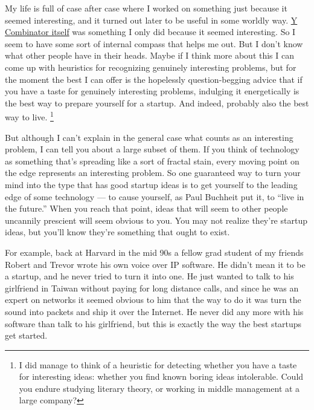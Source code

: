 \documentclass[12pt]{book}
\begin{document}
My life is full of case after case where I worked on something just
because it seemed interesting, and it turned out later to be useful in
some worldly way. \href{http://ycombinator.com/start.html}{Y Combinator
itself} was something I only did because it seemed interesting. So I
seem to have some sort of internal compass that helps me out. But I
don't know what other people have in their heads. Maybe if I think more
about this I can come up with heuristics for recognizing genuinely
interesting problems, but for the moment the best I can offer is the
hopelessly question-begging advice that if you have a taste for
genuinely interesting problems, indulging it energetically is the best
way to prepare yourself for a startup. And indeed, probably also the
best way to live. \footnote{I did manage to think of a heuristic for detecting whether you
have a taste for interesting ideas: whether you find known boring ideas
intolerable. Could you endure studying literary theory, or working in
middle management at a large company?}

But although I can't explain in the general case what counts as an
interesting problem, I can tell you about a large subset of them. If you
think of technology as something that's spreading like a sort of fractal
stain, every moving point on the edge represents an interesting problem.
So one guaranteed way to turn your mind into the type that has good
startup ideas is to get yourself to the leading edge of some technology
--- to cause yourself, as Paul Buchheit put it, to ``live in the
future.'' When you reach that point, ideas that will seem to other
people uncannily prescient will seem obvious to you. You may not realize
they're startup ideas, but you'll know they're something that ought to
exist.

For example, back at Harvard in the mid 90s a fellow grad student of my
friends Robert and Trevor wrote his own voice over IP software. He
didn't mean it to be a startup, and he never tried to turn it into one.
He just wanted to talk to his girlfriend in Taiwan without paying for
long distance calls, and since he was an expert on networks it seemed
obvious to him that the way to do it was turn the sound into packets and
ship it over the Internet. He never did any more with his software than
talk to his girlfriend, but this is exactly the way the best startups
get started.
\end{document}
